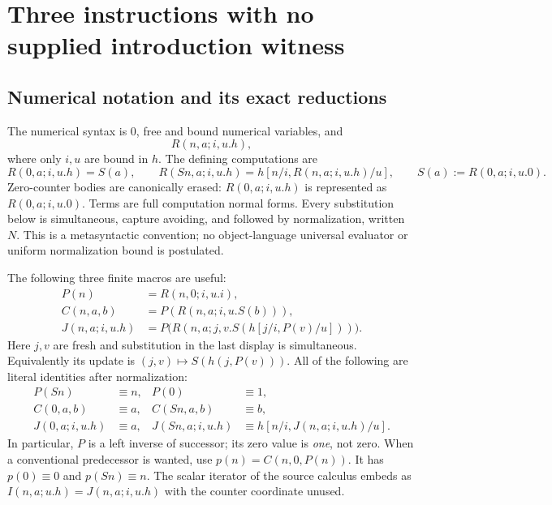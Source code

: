 \documentclass[11pt]{article}
\theoremstyle{definition}\newtheorem{definition}[theorem]{Definition}
\theoremstyle{remark}\newtheorem{remark}[theorem]{Remark}
\begin{document}
\section{Three instructions with no supplied introduction witness}
\label{sec:three-rule-core}

\subsection{Numerical notation and its exact reductions}

The numerical syntax is $0$, free and bound numerical variables, and
\[
                       R(n,a;i,u.h),
\]
where only $i,u$ are bound in $h$.  The defining computations are
\[
 R(0,a;i,u.h)=S(a),\qquad
 R(Sn,a;i,u.h)=h[n/i,R(n,a;i,u.h)/u],
 \qquad S(a):=R(0,a;i,u.0).
\]
Zero-counter bodies are canonically erased: $R(0,a;i,u.h)$ is represented
as $R(0,a;i,u.0)$.  Terms are full computation normal forms.  Every
substitution below is simultaneous, capture avoiding, and followed by
normalization, written $N$.  This is a metasyntactic convention; no
object-language universal evaluator or uniform normalization bound is
postulated.

The following three finite macros are useful:
\begin{align*}
 P(n)&=R(n,0;i,u.i),\\
 C(n,a,b)&=P(R(n,a;i,u.S(b))),\\
 J(n,a;i,u.h)&=P\bigl(R(n,a;j,v.S(h[j/i,P(v)/u]))\bigr).
\end{align*}
Here $j,v$ are fresh and substitution in the last display is simultaneous.
Equivalently its update is $(j,v)\mapsto S(h(j,P(v)))$.
All of the following are literal identities after normalization:
\begin{align*}
 P(Sn)&\equiv n,&P(0)&\equiv1,\\
 C(0,a,b)&\equiv a,&C(Sn,a,b)&\equiv b,\\
 J(0,a;i,u.h)&\equiv a,
 &J(Sn,a;i,u.h)&\equiv h[n/i,J(n,a;i,u.h)/u].
\end{align*}
In particular, $P$ is a left inverse of successor; its zero value is
\emph{one}, not zero.  When a conventional predecessor is wanted, use
$p(n)=C(n,0,P(n))$.  It has $p(0)\equiv0$ and $p(Sn)\equiv n$.
The scalar iterator of the source calculus embeds as
$I(n,a;u.h)=J(n,a;i,u.h)$ with the counter coordinate unused.
\end{document}
